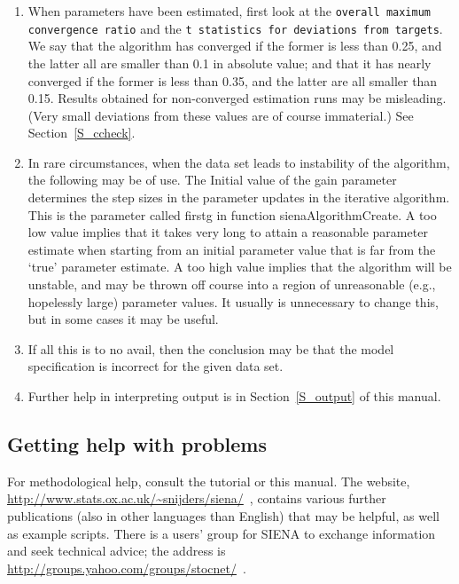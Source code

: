 \documentclass[a4paper,fleqn,11pt]{article}
\newcommand{\+}{\, + \,}
\newcommand{\SI}{{\sf SIENA }}
\begin{document}
\begin{enumerate}
      If Jaccard indices are low because the network is mainly increasing
      (creation of new ties) or decreasing (termination of ties),
      this is no problem for the \SI method. Very sparse networks
      (with most degrees less than 2) also may have lower Jaccard values
      without negative consequences for estimation.
\item When parameters have been estimated, first look at the
     \texttt{overall maximum \\convergence ratio} and the \texttt{t statistics for deviations
      from targets}.
      We say that the algorithm has converged if the former is less than 0.25,
      and the latter all are smaller than 0.1 in absolute value;
      and that it has nearly converged if the former is less than 0.35, and the latter are all
      smaller than 0.15. Results obtained for non-converged estimation
      runs may be misleading. (Very small deviations from these
      values are of course immaterial.) See Section~\ref{S_ccheck}.
\item In rare circumstances, when the data set leads to instability
      of the algorithm, the following may be of use.
      The \textsf{Initial value of the gain parameter} determines the
      step sizes in the parameter updates in the iterative
      algorithm.
      This is the parameter called \textsf{firstg}
      in function \textsf{sienaAlgorithmCreate}.
      A too low value implies that it takes very long to attain a
      reasonable parameter estimate when starting from an initial
      parameter value that is far from the `true' parameter estimate.
      A too high value implies that the algorithm will be unstable,
      and may be thrown off course into a region of unreasonable
      (e.g., hopelessly large) parameter values. It usually is unnecessary
      to change this, but in some cases it may be useful.
\item If all this is to no avail, then the conclusion may be that the model
      specification is incorrect for the given data set.
\item Further help in interpreting output is in Section~\ref{S_output} of
      this manual.
\end{enumerate}


\subsection{Getting help with problems}
\label{sec:problems}

For methodological help, consult the tutorial  \citet{SnijdersEA10b} or this manual.
The website, {\small\url{http://www.stats.ox.ac.uk/~snijders/siena/}~}, contains
various further publications (also in other languages than English) that may
be helpful, as well as example scripts.
There is a users' group for \SI to exchange information and seek technical
advice; the address is {\small\url{http://groups.yahoo.com/groups/stocnet/}~}.
\end{document}
